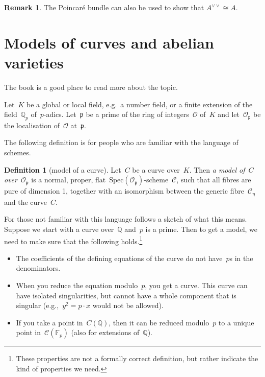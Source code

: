 \documentclass[12pt]{article}
\theoremstyle{definition}
\newtheorem{definition}[theorem]{Definition}
\newtheorem{remark}[theorem]{Remark}
\numberwithin{equation}{subsection}
\newcommand{\Q}{\ensuremath{\mathbb{Q}}}
\newcommand{\F}{\ensuremath{\mathbb{F}}}
\begin{document}
\begin{remark}
The Poincar\'e bundle can also be used to show that $A^{\vee\vee} \cong A$.
\end{remark}


\section{Models of curves and abelian varieties}

The book \cite{Liu} is a good place to read more about the topic.

Let~$K$ be a global or local field, e.g.\ a number field, or a finite extension of the field~$\mathbb{Q}_p$ of~$p$-adics. Let~$\mathfrak{p}$ be a prime of the ring of integers~$\mathcal{O}$ of~$K$ and let~$\mathcal{O}_\mathfrak{p}$ be the localisation of~$\mathcal{O}$ at~$\mathfrak{p}$.

The following definition is for people who are familiar with the language of schemes.

\begin{definition}[model of a curve]
Let~$C$ be a curve over~$K$. Then {\em a model of~$C$ over~$\mathcal{O}_\mathfrak{p}$} is a normal, proper, flat~$\mathrm{Spec}(\mathcal{O}_\mathfrak{p})$-scheme~$\mathcal{C}$, such that all fibres are pure of dimension 1, together with an isomorphism between the generic fibre~$\mathcal{C}_{\eta}$ and the curve~$C$.
\end{definition}

For those not familiar with this language follows a sketch of what this means. Suppose we start with a curve over~$\Q$ and~$p$ is a prime. Then to get a model, we need to make sure that the following holds.\footnote{These properties are not a formally correct definition, but rather indicate the kind of properties we need.}\\[-0.7cm]
\begin{itemize}\itemsep0pt
\item The coefficients of the defining equations of the curve do not have~$p$s in the denominators.
\item When you reduce the equation modulo~$p$, you get a curve. This curve can have isolated singularities, but cannot have a whole component that is singular (e.g.,~$y^2 = p\cdot x$ would not be allowed).
\item If you take a point in~$C(\Q)$, then it can be reduced modulo~$p$ to a unique point in~$\mathcal{C}(\F_p)$ (also for extensions of~$\Q$).
\end{itemize}
\end{document}
